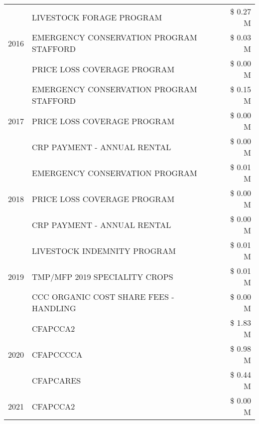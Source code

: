 \begin{tabular}{llr}
\cline{1-3}
\multirow[t]{3}{*}{2016} & LIVESTOCK FORAGE PROGRAM & \$ 0.27 M \\
 & EMERGENCY CONSERVATION PROGRAM STAFFORD & \$ 0.03 M \\
 & PRICE LOSS COVERAGE PROGRAM & \$ 0.00 M \\
\cline{1-3}
\multirow[t]{3}{*}{2017} & EMERGENCY CONSERVATION PROGRAM STAFFORD & \$ 0.15 M \\
 & PRICE LOSS COVERAGE PROGRAM & \$ 0.00 M \\
 & CRP PAYMENT - ANNUAL RENTAL & \$ 0.00 M \\
\cline{1-3}
\multirow[t]{3}{*}{2018} & EMERGENCY CONSERVATION PROGRAM & \$ 0.01 M \\
 & PRICE LOSS COVERAGE PROGRAM & \$ 0.00 M \\
 & CRP PAYMENT - ANNUAL RENTAL & \$ 0.00 M \\
\cline{1-3}
\multirow[t]{3}{*}{2019} & LIVESTOCK INDEMNITY PROGRAM & \$ 0.01 M \\
 & TMP/MFP 2019 SPECIALITY CROPS & \$ 0.01 M \\
 & CCC ORGANIC COST SHARE FEES - HANDLING & \$ 0.00 M \\
\cline{1-3}
\multirow[t]{3}{*}{2020} & CFAPCCA2 & \$ 1.83 M \\
 & CFAPCCCCA & \$ 0.98 M \\
 & CFAPCARES & \$ 0.44 M \\
\cline{1-3}
2021 & CFAPCCA2 & \$ 0.00 M \\
\cline{1-3}
\bottomrule
\end{tabular}
